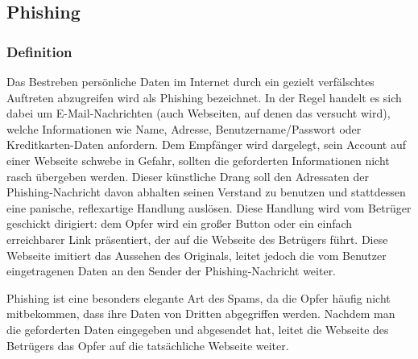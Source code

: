 \subsection{Phishing} %
\label{sub:phishing}
\subsubsection{Definition} %
\label{ssub:definition}
Das Bestreben persönliche Daten im Internet durch ein gezielt verfälschtes Auftreten abzugreifen wird als Phishing bezeichnet.
In der Regel handelt es sich dabei um E-Mail-Nachrichten (auch Webseiten, auf denen das versucht wird), welche Informationen wie Name, Adresse, Benutzername/Passwort oder Kreditkarten-Daten anfordern.
Dem Empfänger wird dargelegt, sein Account auf einer Webseite schwebe in Gefahr, sollten die geforderten Informationen nicht rasch übergeben werden.
Dieser künstliche Drang soll den Adressaten der Phishing-Nachricht davon abhalten seinen Verstand zu benutzen und stattdessen eine panische, reflexartige Handlung auslösen.
Diese Handlung wird vom Betrüger geschickt dirigiert: dem Opfer wird ein großer Button oder ein einfach erreichbarer Link präsentiert, der auf die Webseite des Betrügers führt.
Diese Webseite imitiert das Aussehen des Originals, leitet jedoch die vom Benutzer eingetragenen Daten an den Sender der Phishing-Nachricht weiter.

Phishing ist eine besonders elegante Art des Spams, da die Opfer häufig nicht mitbekommen, dass ihre Daten von Dritten abgegriffen werden.
Nachdem man die geforderten Daten eingegeben und abgesendet hat, leitet die Webseite des Betrügers das Opfer auf die tatsächliche Webseite weiter.
